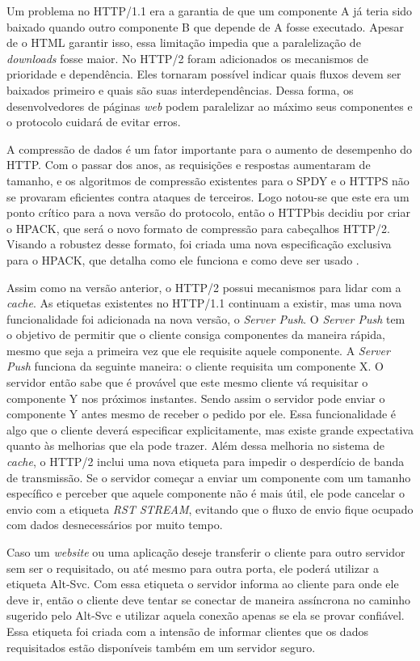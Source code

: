 Um problema no HTTP/1.1 era a garantia de que um componente A já teria sido baixado quando outro componente B que depende de A fosse executado. Apesar de o HTML garantir isso, essa limitação impedia que a paralelização de \textit{downloads} fosse maior. No HTTP/2 foram adicionados os mecanismos de prioridade e dependência. Eles tornaram possível indicar quais fluxos devem ser baixados primeiro e quais são suas interdependências. Dessa forma, os desenvolvedores de páginas \textit{web} podem paralelizar ao máximo seus componentes e o protocolo cuidará de evitar erros. 

A compressão de dados é um fator importante para o aumento de desempenho do HTTP. Com o passar dos anos, as requisições e respostas aumentaram de tamanho, e os algoritmos de compressão existentes para o SPDY e o HTTPS não se provaram eficientes contra ataques de terceiros. Logo notou-se que este era um ponto crítico para a nova versão do protocolo, então o HTTPbis decidiu por criar o HPACK, que será o novo formato de compressão para cabeçalhos HTTP/2. Visando a robustez desse formato, foi criada uma nova especificação exclusiva para o HPACK, que detalha como ele funciona e como deve ser usado \cite{HPACKSpec}.

Assim como na versão anterior, o HTTP/2 possui mecanismos para lidar com a \textit{cache}. As etiquetas existentes no HTTP/1.1 continuam a existir, mas uma nova funcionalidade foi adicionada na nova versão, o \textit{Server Push}. O \textit{Server Push} tem o objetivo de permitir que o cliente consiga componentes da maneira rápida, mesmo que seja a primeira vez que ele requisite aquele componente. A \textit{Server Push} funciona da seguinte maneira: o cliente requisita um componente X. O servidor então sabe que é provável que este mesmo cliente vá requisitar o componente Y nos próximos instantes. Sendo assim o servidor pode enviar o componente Y antes mesmo de receber o pedido por ele. Essa funcionalidade é algo que o cliente deverá especificar explicitamente, mas existe grande expectativa quanto às melhorias que ela pode trazer. Além dessa melhoria no sistema de \textit{cache}, o HTTP/2 inclui uma nova etiqueta para impedir o desperdício de banda de transmissão. Se o servidor começar a enviar um componente com um tamanho específico e perceber que aquele componente não é mais útil, ele pode cancelar o envio com a etiqueta \textit{RST STREAM}, evitando que o fluxo de envio fique ocupado com dados desnecessários por muito tempo.

Caso um \textit{website} ou uma aplicação deseje transferir o cliente para outro servidor sem ser o requisitado, ou até mesmo para outra porta, ele poderá utilizar a etiqueta Alt-Svc. Com essa etiqueta o servidor informa ao cliente para onde ele deve ir, então o cliente deve tentar se conectar de maneira assíncrona no caminho sugerido pelo Alt-Svc e utilizar aquela conexão apenas se ela se provar confiável. Essa etiqueta foi criada com a intensão de informar clientes que os dados requisitados estão disponíveis também em um servidor seguro.

